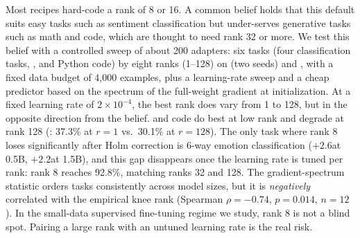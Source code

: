 Most \lora recipes hard-code a rank of 8 or 16. A common belief holds that this default suits easy tasks such as sentiment classification but under-serves generative tasks such as math and code, which are thought to need rank 32 or more. We test this belief with a controlled sweep of about 200 adapters: six tasks (four classification tasks, \gsm, and Python code) by eight ranks (1--128) on \qsmall (two seeds) and \qlarge, with a fixed data budget of 4,000 examples, plus a learning-rate sweep and a cheap predictor based on the spectrum of the full-weight gradient at initialization. At a fixed learning rate of $2\times10^{-4}$, the best rank does vary from 1 to 128, but in the opposite direction from the belief. \gsm and code do best at low rank and degrade at rank 128 (\gsm: 37.3\% at $r{=}1$ vs.\ 30.1\% at $r{=}128$). The only task where rank 8 loses significantly after Holm correction is 6-way emotion classification ($+2.6$\pp at 0.5B, $+2.2$\pp at 1.5B), and this gap disappears once the learning rate is tuned per rank: rank 8 reaches 92.8\%, matching ranks 32 and 128. The gradient-spectrum statistic orders tasks consistently across model sizes, but it is \emph{negatively} correlated with the empirical knee rank (Spearman $\rho=-0.74$, $p=0.014$, $n=12$). In the small-data supervised fine-tuning regime we study, rank 8 is not a blind spot. Pairing a large rank with an untuned learning rate is the real risk.
